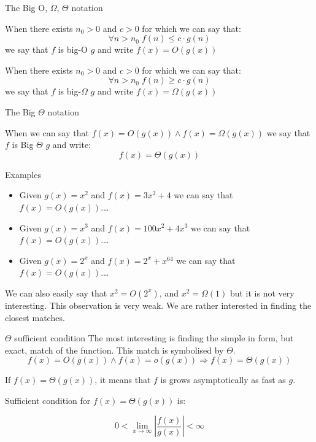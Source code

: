 \documentclass{beamer}
\begin{document}
\begin{frame}{The Big O, $\Omega$, $\Theta$ notation}

When there exists $n_0>0$ and $c>0$ for which we can say that:
$$\forall{n>n_0} \; f(n) \leq c\cdot g(n) $$
we say that $f$ is big-O $g$ and write $f(x)=O(g(x))$

When there exists $n_0>0$ and $c>0$ for which we can say that:
$$\forall{n>n_0} \; f(n) \geq c\cdot g(n) $$
we say that $f$ is big-$\Omega$ $g$ and write $f(x)=\Omega(g(x))$


\end{frame}

\begin{frame}{The Big $\Theta$ notation}

When we can say that $f(x)=O(g(x)) \wedge f(x)=\Omega(g(x))$ we say that $f$ is Big $\Theta$ $g$ and write:
$$f(x)=\Theta(g(x))$$

\end{frame}


\begin{frame}{Examples}

\begin{itemize}
	\item Given $g(x)=x^2$ and $f(x)=3x^2+4$ we can say that $f(x)=O(g(x))$.\ldots
	\item Given $g(x)=x^3$ and $f(x)=100x^2+4x^3$ we can say that $f(x)=O(g(x))$.\ldots
    \item Given $g(x)=2^x$ and $f(x)=2^x+x^{64}$ we can say that $f(x)=O(g(x))$.\ldots
\end{itemize}
We can also easily say that $x^2=O(2^x)$, and $x^2=\Omega(1)$ but it is not very interesting. This observation is very weak. We are rather interested in finding the closest matches.

\end{frame}


\begin{frame}{$\Theta$ sufficient condition}
The most interesting is finding the simple in form, but exact, match of the function. This match is symbolised by $\Theta$. $$f(x)=O(g(x)) \wedge f(x)=o(g(x)) \Longrightarrow f(x)=\Theta(g(x))$$

If $f(x)=\Theta(g(x))$, it means that $f$ is grows asymptotically as fast as $g$.

Sufficient condition for $f(x)=\Theta(g(x))$ is:

$$0<\lim_{x\rightarrow\infty}\left\lvert\frac{f(x)}{g(x)}\right\rvert< \infty$$

\end{frame}
\end{document}
